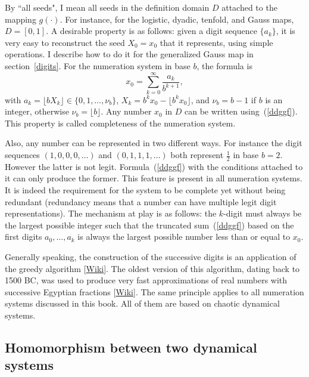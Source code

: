 \documentclass[oneside,10pt]{book}
\begin{document}
\noindent By ``all seeds", I mean all seeds in the definition domain $D$ attached to the mapping $g(\cdot)$. For instance, for the logistic, dyadic, tenfold, and Gauss maps, $D=[0, 1]$. A desirable property is as follows: given a digit sequence $\{a_k\}$, it is very easy to reconstruct the seed $X_0=x_0$ that it represents, using simple operations. I describe how to do it for the generalized Gauss map in section~\ref{digits}. For the numeration system in base $b$, the formula is
\begin{equation}
x_0 = \sum_{k=0}^\infty \frac{a_k}{b^{k+1}},\label{ddggf}
\end{equation}
with
$a_k = \lfloor bX_k\rfloor \in \{0, 1,\dots,  \nu_b\}$,  $X_k = b^k x_0 - \lfloor b^k x_0\rfloor$,
and  $\nu_b = b-1$ if $b$ is an integer, otherwise $\nu_b=\lfloor b\rfloor$.
Any number $x_0$ in $D$ can be written using~(\ref{ddggf}).
 This property is called \textcolor{index}{completeness} of the numeration system. 

Also, any number can be represented in two different ways. For instance the digit sequences $(1, 0,0,0,\dots)$
 and $(0,1,1,1,\dots)$ both represent $\frac{1}{2}$ in base $b=2$. However the latter is not legit. Formula~(\ref{ddggf}) with the conditions attached to it can only produce the former. This feature is present in all numeration systems. It is indeed the  requirement
 for the system to be complete yet without being redundant 
(\textcolor{index}{redundancy} means that a number can have multiple legit digit representations). The mechanism at play is as follows: the $k$-digit must always be the largest possible integer such that the truncated sum~(\ref{ddggf}) based on the first digits $a_0,\dots,a_k$ is always the largest possible number less than or equal to $x_0$.  

Generally speaking, the construction of the successive digits is an application of the
 \textcolor{index}{greedy algorithm} [\href{https://en.wikipedia.org/wiki/Greedy_algorithm}{Wiki}]. The oldest version of this algorithm, dating back to 1500 BC, was used to produce very fast approximations of real numbers with
 successive \textcolor{index}{Egyptian fractions} [\href{https://en.wikipedia.org/wiki/Egyptian_fraction}{Wiki}]. 
The same principle applies to all numeration systems discussed in this book. All of them are based on chaotic dynamical systems.

\subsection{Homomorphism between two dynamical systems}\label{hohok}
\end{document}
